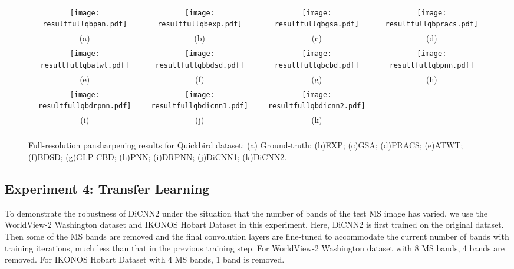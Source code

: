 \documentclass[journal]{IEEEtran}
\begin{document}
\begin{figure*}[t]\scriptsize
\centering
  \begin{tabular}{cccc}
\texttt{[image: resultfullqbpan.pdf]} &
\texttt{[image: resultfullqbexp.pdf]} &
\texttt{[image: resultfullqbgsa.pdf]} &
\texttt{[image: resultfullqbpracs.pdf]} \\
(a) & (b) & (c) & (d) \\

\texttt{[image: resultfullqbatwt.pdf]} &
\texttt{[image: resultfullqbbdsd.pdf]} &
\texttt{[image: resultfullqbcbd.pdf]} &
\texttt{[image: resultfullqbpnn.pdf]} \\
 (e) & (f) &(g) & (h)\\

\texttt{[image: resultfullqbdrpnn.pdf]} &
\texttt{[image: resultfullqbdicnn1.pdf]} &
\texttt{[image: resultfullqbdicnn2.pdf]} \\
 (i) & (j) & (k)  \\
\\
\end{tabular}
\caption{Full-resolution pansharpening results for Quickbird dataset: (a) Ground-truth; (b)EXP; (c)GSA; (d)PRACS; (e)ATWT; (f)BDSD;  (g)GLP-CBD; (h)PNN; (i)DRPNN; (j)DiCNN1; (k)DiCNN2.}
\label{figure:map:full-qb}
\end{figure*}

\subsection{Experiment 4: Transfer Learning}

To demonstrate the robustness of DiCNN2 under the situation that the number of bands of the test MS image has varied, we use the WorldView-2 Washington dataset and IKONOS Hobart Dataset in this experiment. Here, DiCNN2 is first trained on the original dataset. Then some of the MS bands are removed and the final convolution layers are fine-tuned to accommodate the current number of bands with  training iterations, much less than that in the previous training step. For WorldView-2 Washington dataset with 8 MS bands, 4 bands are removed. For IKONOS Hobart Dataset with 4 MS bands, 1 band is removed.
\end{document}
